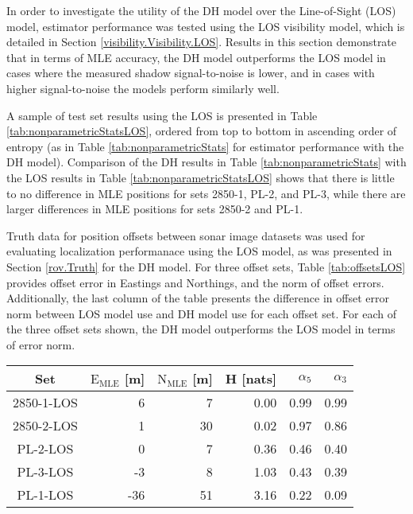 In order to investigate the utility of the DH model over the Line-of-Sight (LOS) model, estimator performance was tested using the LOS visibility model, which is detailed in Section \ref{visibility.Visibility.LOS}.
Results in this section demonstrate that in terms of MLE accuracy, the DH model outperforms the LOS model in cases where the measured shadow signal-to-noise is lower, and in cases with higher signal-to-noise the models perform similarly well.

A sample of test set results using the LOS is presented in Table \ref{tab:nonparametricStatsLOS}, ordered from top to bottom in ascending order of entropy (as in Table \ref{tab:nonparametricStats} for estimator performance with the DH model).
Comparison of the DH results in Table \ref{tab:nonparametricStats} with the LOS results in Table \ref{tab:nonparametricStatsLOS} shows that there is little to no difference in MLE positions for sets 2850-1, PL-2, and PL-3, while there are larger differences in MLE positions for sets 2850-2 and PL-1.

Truth data for position offsets between sonar image datasets was used for evaluating localization performanace using the LOS model, as was presented in Section \ref{rov.Truth} for the DH model.
For three offset sets, Table \ref{tab:offsetsLOS} provides offset error in Eastings and Northings, and the norm of offset errors.
Additionally, the last column of the table presents the difference in offset error norm between LOS model use and DH model use for each offset set.
For each of the three offset sets shown, the DH model outperforms the LOS model in terms of error norm.

\begin{center}
	\begin{tabular}{|c|r|r|r|r|r|}
		\hline
		Set & $\text{E}_\textrm{MLE}$ [m] & $\text{N}_\textrm{MLE}$ [m] & H [nats] & $\alpha_5$ & $\alpha_3$ \\ \hline
		2850-1-LOS & 6 & 7 & 0.00 & 0.99 & 0.99 \\ \hline
		2850-2-LOS & 1 & 30 & 0.02 & 0.97 & 0.86 \\ \hline
		PL-2-LOS & 0 & 7 & 0.36 & 0.46 & 0.40 \\ \hline
		PL-3-LOS & -3 & 8 & 1.03 & 0.43 & 0.39   \\ \hline
		PL-1-LOS & -36 & 51 & 3.16 & 0.22 & 0.09 \\ \hline
	\end{tabular}	
	\label{tab:nonparametricStatsLOS} 
\end{center}

